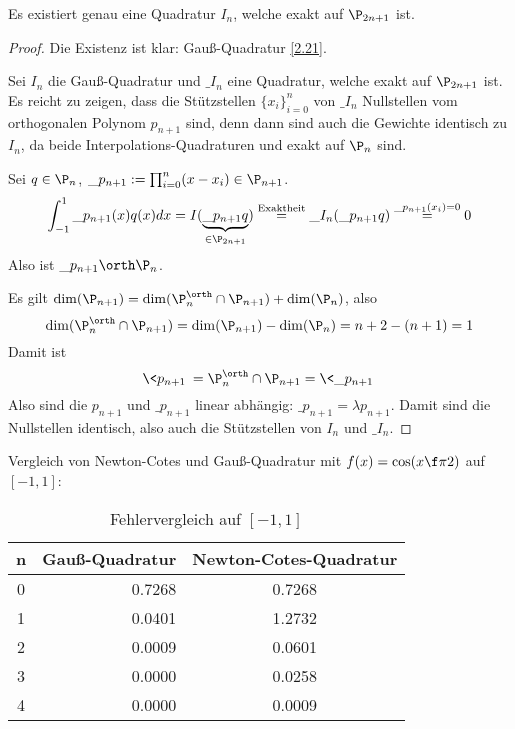 \documentclass[11pt]{scrbook}
\begin{document}
\begin{st}
	\label{2.23}
	Es existiert genau eine Quadratur $I_n$, welche exakt auf $\P_{2n+1}$ ist.
	\begin{proof}
		Die Existenz ist klar: Gauß-Quadratur \ref{2.21}.

		Sei $I_n$ die Gauß-Quadratur und $\_{I_n}$ eine Quadratur, welche exakt auf $\P_{2n+1}$ ist.
		Es reicht zu zeigen, dass die Stützstellen $\{x_i\}_{i=0}^n$ von $\_{I_n}$ Nullstellen vom orthogonalen Polynom $p_{n+1}$ sind, denn dann sind auch die Gewichte identisch zu $I_n$, da beide Interpolations-Quadraturen und exakt auf $\P_n$ sind.
	
		Sei $q\in \P_n$, $\_p_{n+1} := \prod_{i=0}^n (x-x_i) \in \P_{n+1}$.
		\[
			\int_{-1}^1 \_p_{n+1}(x) q(x) dx 
			= I(\underbrace{\_p_{n+1} q}_{\in \P_{2n+1}})
			\stackrel{\text{Exaktheit}}= \_I_n (\_p_{n+1}q)
			\stackrel{\_p_{n+1}(x_i)=0}= 0
		\]
		Also ist $\_p_{n+1} \orth \P_n$.

		Es gilt $\dim(\P_{n+1}) = \dim( \P_n^\orth \cap \P_{n+1}) + \dim (\P_n)$, also
		\[
			\dim( \P_n^\orth \cap \P_{n+1}) = \dim(\P_{n+1}) - \dim(\P_n) = n+2 - (n+1) = 1
		\]
		Damit ist 
		\[
			 \<p_{n+1}\> = \P_n^\orth \cap \P_{n+1} = \<\_p_{n+1}\>
		\]
		Also sind die $p_{n+1}$ und $\_p_{n+1}$ linear abhängig: $\_p_{n+1} = \lambda p_{n+1}$.
		Damit sind die Nullstellen identisch, also auch die Stützstellen von $I_n$ und $\_I_n$.
	\end{proof}
\end{st}

\begin{ex*}
Vergleich von Newton-Cotes und Gauß-Quadratur mit $f(x)=\cos(x\f \pi 2)$ auf $[-1,1]$: \\
	\begin{table}[H]
		\centering
		\caption{Fehlervergleich auf $[-1,1]$}
		\begin{tabular}{c|r|c}
			n & Gauß-Quadratur & Newton-Cotes-Quadratur \\ \hline
			0 & 0.7268 & 0.7268 \\
			1 & 0.0401 & 1.2732 \\
			2 & 0.0009 & 0.0601 \\
			3 & 0.0000 & 0.0258 \\
			4 & 0.0000 & 0.0009 \\
		\end{tabular}
	\end{table}
\end{ex*}
\end{document}
